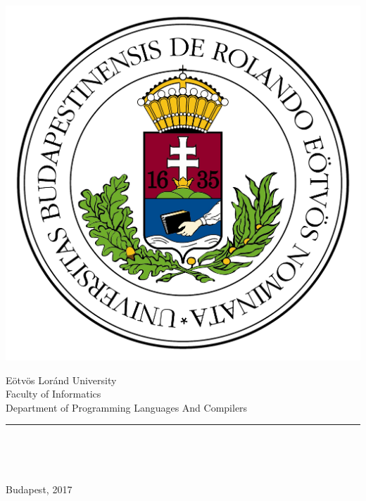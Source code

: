 \begin{titlepage}

\begin{minipage}{0.40\linewidth}
\includegraphics[scale=0.3]{images/elte_logo}
\end{minipage}
\begin{minipage}{0.50\linewidth}
\begin{center}
Eötvös Loránd University \\
Faculty of Informatics \\
Department of Programming Languages And Compilers
\end{center}
\end{minipage}

\hrule
\vfill

\begin{center}
\Huge
\textbf{\Title}
\normalsize
\end{center}

\vfill

\begin{minipage}[t]{0.45\linewidth}
\begin{flushleft}
\textbf{\SupervisorName} \\
\SupervisorTitle
\end{flushleft}
\end{minipage}
\begin{minipage}[t]{0.5\linewidth}
\begin{flushright}
\textbf{\Author} \\
\AuthortTitle
\end{flushright}
\end{minipage}

\vfill

\begin{center}
Budapest, 2017
\end{center}

\end{titlepage}

